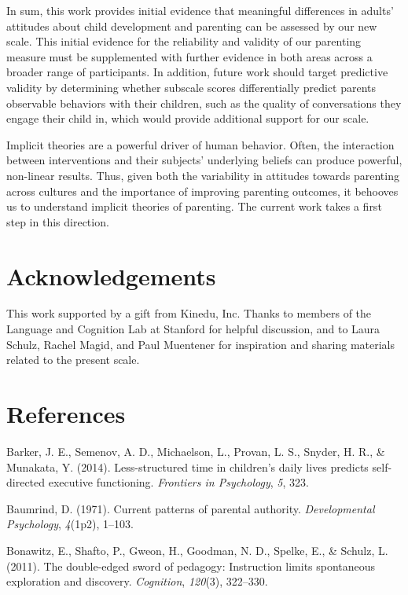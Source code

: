 \documentclass[10pt, letterpaper]{article}
\begin{document}
In sum, this work provides initial evidence that meaningful differences
in adults' attitudes about child development and parenting can be
assessed by our new scale. This initial evidence for the reliability and
validity of our parenting measure must be supplemented with further
evidence in both areas across a broader range of participants. In
addition, future work should target predictive validity by determining
whether subscale scores differentially predict parents observable
behaviors with their children, such as the quality of conversations they
engage their child in, which would provide additional support for our
scale.

Implicit theories are a powerful driver of human behavior. Often, the
interaction between interventions and their subjects' underlying beliefs
can produce powerful, non-linear results. Thus, given both the
variability in attitudes towards parenting across cultures and the
importance of improving parenting outcomes, it behooves us to understand
implicit theories of parenting. The current work takes a first step in
this direction.

\section{Acknowledgements}\label{acknowledgements}

This work supported by a gift from Kinedu, Inc. Thanks to members of the
Language and Cognition Lab at Stanford for helpful discussion, and to
Laura Schulz, Rachel Magid, and Paul Muentener for inspiration and
sharing materials related to the present scale.

\section{References}\label{references}

\small

Barker, J. E., Semenov, A. D., Michaelson, L., Provan, L. S., Snyder, H.
R., \& Munakata, Y. (2014). Less-structured time in children's daily
lives predicts self-directed executive functioning. \emph{Frontiers in
Psychology}, \emph{5}, 323.

Baumrind, D. (1971). Current patterns of parental authority.
\emph{Developmental Psychology}, \emph{4}(1p2), 1--103.

Bonawitz, E., Shafto, P., Gweon, H., Goodman, N. D., Spelke, E., \&
Schulz, L. (2011). The double-edged sword of pedagogy: Instruction
limits spontaneous exploration and discovery. \emph{Cognition},
\emph{120}(3), 322--330.
\end{document}
